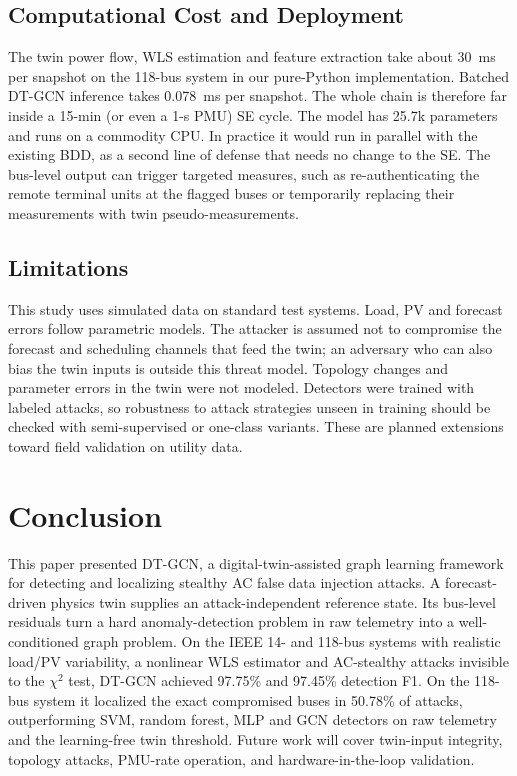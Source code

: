\subsection{Computational Cost and Deployment}
The twin power flow, WLS estimation and feature extraction take about 30~ms per snapshot on the 118-bus system in our pure-Python implementation. Batched DT-GCN inference takes 0.078~ms per snapshot. The whole chain is therefore far inside a 15-min (or even a 1-s PMU) SE cycle. The model has 25.7k parameters and runs on a commodity CPU. In practice it would run in parallel with the existing BDD, as a second line of defense that needs no change to the SE. The bus-level output can trigger targeted measures, such as re-authenticating the remote terminal units at the flagged buses or temporarily replacing their measurements with twin pseudo-measurements.

\subsection{Limitations}
This study uses simulated data on standard test systems. Load, PV and forecast errors follow parametric models. The attacker is assumed not to compromise the forecast and scheduling channels that feed the twin; an adversary who can also bias the twin inputs is outside this threat model. Topology changes and parameter errors in the twin were not modeled. Detectors were trained with labeled attacks, so robustness to attack strategies unseen in training should be checked with semi-supervised or one-class variants. These are planned extensions toward field validation on utility data.

\section{Conclusion}
This paper presented DT-GCN, a digital-twin-assisted graph learning framework for detecting and localizing stealthy AC false data injection attacks. A forecast-driven physics twin supplies an attack-independent reference state. Its bus-level residuals turn a hard anomaly-detection problem in raw telemetry into a well-conditioned graph problem. On the IEEE 14- and 118-bus systems with realistic load/PV variability, a nonlinear WLS estimator and AC-stealthy attacks invisible to the $\chi^2$ test, DT-GCN achieved 97.75\% and 97.45\% detection F1. On the 118-bus system it localized the exact compromised buses in 50.78\% of attacks, outperforming SVM, random forest, MLP and GCN detectors on raw telemetry and the learning-free twin threshold. Future work will cover twin-input integrity, topology attacks, PMU-rate operation, and hardware-in-the-loop validation.
